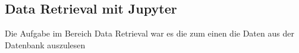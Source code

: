 \subsection{Data Retrieval mit Jupyter}
Die Aufgabe im Bereich Data Retrieval war es die zum einen die Daten aus der Datenbank auszulesen
